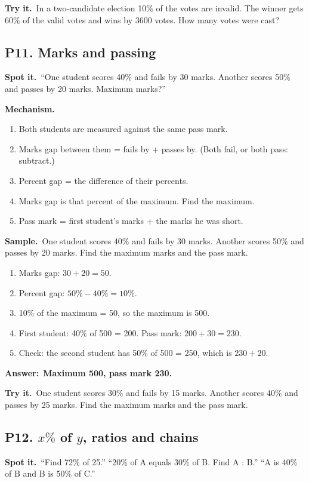 \documentclass[11pt,a4paper]{article}
\let\oldsubsection\subsection
\renewcommand{\subsection}{\needspace{9\baselineskip}\oldsubsection}
\newcommand{\spot}{\textbf{\color{ember}Spot it.}\ }
\newcommand{\mech}{\textbf{\color{ember}Mechanism.}\ }
\newif\ifkeepsamp
\newcommand{\ans}[1]{\par\nopagebreak\noindent\textbf{\color{ember}Answer:}\ \textbf{#1}\par}
\newcommand{\samp}{\ifkeepsamp\needspace{4\baselineskip}\fi\textbf{\color{ember}Sample.}\ }
\newcommand{\tryit}[1]{\textbf{\color{ember}Try it.}\ #1}
\begin{document}
\tryit In a two-candidate election 10\% of the votes are invalid. The winner gets 60\% of the valid votes and wins by 3600 votes. How many votes were cast?

\subsection{P11. Marks and passing}
\spot ``One student scores 40\% and fails by 30 marks. Another scores 50\% and passes by 20 marks. Maximum marks?''

\mech
\begin{enumerate}
\item Both students are measured against the same pass mark.
\item Marks gap between them = fails by + passes by. (Both fail, or both pass: subtract.)
\item Percent gap = the difference of their percents.
\item Marks gap is that percent of the maximum. Find the maximum.
\item Pass mark = first student's marks + the marks he was short.
\end{enumerate}

\samp One student scores 40\% and fails by 30 marks. Another scores 50\% and passes by 20 marks. Find the maximum marks and the pass mark.
\begin{enumerate}
\item Marks gap: $30 + 20 = 50$.
\item Percent gap: $50\% - 40\% = 10\%$.
\item 10\% of the maximum = 50, so the maximum is 500.
\item First student: 40\% of 500 = 200. Pass mark: $200 + 30 = 230$.
\item Check: the second student has 50\% of 500 = 250, which is $230 + 20$.
\end{enumerate}
\ans{Maximum 500, pass mark 230.}

\tryit One student scores 30\% and fails by 15 marks. Another scores 40\% and passes by 25 marks. Find the maximum marks and the pass mark.

\subsection{P12. \texorpdfstring{$x\%$ of $y$}{x percent of y}, ratios and chains}
\spot ``Find 72\% of 25.'' ``20\% of A equals 30\% of B. Find A : B.'' ``A is 40\% of B and B is 50\% of C.''
\end{document}
